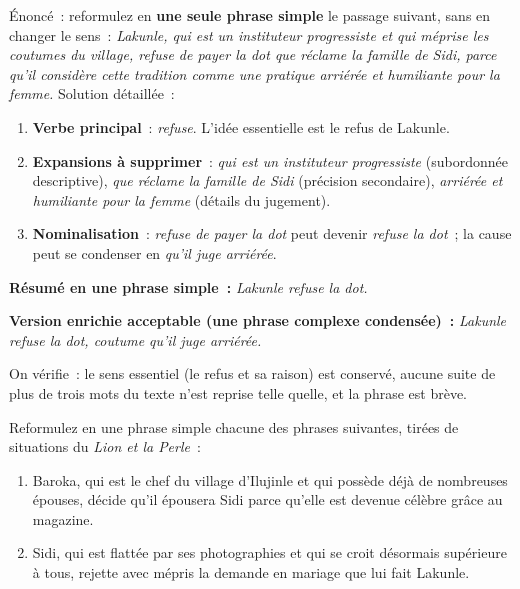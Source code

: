 \documentclass[11pt]{article}
\begin{document}
\begin{exoresolu}
Énoncé~: reformulez en \textbf{une seule phrase simple} le passage suivant, sans en changer le sens~: \emph{Lakunle, qui est un instituteur progressiste et qui méprise les coutumes du village, refuse de payer la dot que réclame la famille de Sidi, parce qu'il considère cette tradition comme une pratique arriérée et humiliante pour la femme.}
\tcblower
Solution détaillée~:
\begin{enumerate}
\item \textbf{Verbe principal}~: \emph{refuse}. L'idée essentielle est le refus de Lakunle.
\item \textbf{Expansions à supprimer}~: \emph{qui est un instituteur progressiste} (subordonnée descriptive), \emph{que réclame la famille de Sidi} (précision secondaire), \emph{arriérée et humiliante pour la femme} (détails du jugement).
\item \textbf{Nominalisation}~: \emph{refuse de payer la dot} peut devenir \emph{refuse la dot}~; la cause peut se condenser en \emph{qu'il juge arriérée}.
\end{enumerate}
\textbf{Résumé en une phrase simple~:} \emph{Lakunle refuse la dot.}

\textbf{Version enrichie acceptable (une phrase complexe condensée)~:} \emph{Lakunle refuse la dot, coutume qu'il juge arriérée.}

On vérifie~: le sens essentiel (le refus et sa raison) est conservé, aucune suite de plus de trois mots du texte n'est reprise telle quelle, et la phrase est brève.
\end{exoresolu}

\begin{exercice}
Reformulez en une phrase simple chacune des phrases suivantes, tirées de situations du \emph{Lion et la Perle}~:
\begin{enumerate}
\item Baroka, qui est le chef du village d'Ilujinle et qui possède déjà de nombreuses épouses, décide qu'il épousera Sidi parce qu'elle est devenue célèbre grâce au magazine.
\item Sidi, qui est flattée par ses photographies et qui se croit désormais supérieure à tous, rejette avec mépris la demande en mariage que lui fait Lakunle.
\end{enumerate}
\end{exercice}
\end{document}
